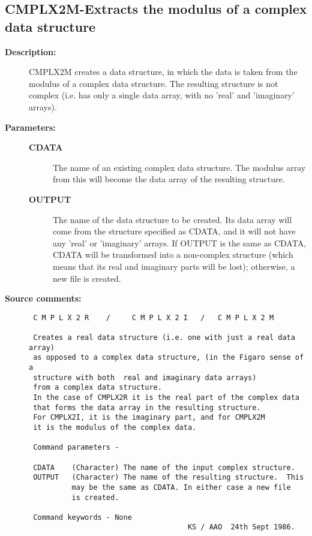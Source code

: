 \subsection{CMPLX2M-\label{CMPLX2M}Extracts the modulus of a complex data structure}
\begin{description}

\item [{\bf Description:}]
 CMPLX2M creates a data structure, in which the data is taken
 from the modulus of a complex data structure.  The resulting
 structure is not complex (i.e. has only a single data array, with
 no 'real' and 'imaginary' arrays).

\item [{\bf Parameters:}]
\begin{description}
\item [{\bf CDATA}]
 The name of an existing complex data structure.
 The modulus array from this will become the data array
 of the resulting structure.
\item [{\bf OUTPUT}]
 The name of the data structure to be created.
 Its data array will come from the structure specified as
 CDATA, and it will not have any 'real' or 'imaginary'
 arrays.  If OUTPUT is the same as CDATA, CDATA will be
 transformed into a non-complex structure (which means
 that its real and imaginary parts will be lost);
 otherwise, a new file is created.
\end{description}

\item [{\bf Source comments:}]
\begin{verbatim}
 C M P L X 2 R    /     C M P L X 2 I   /   C M P L X 2 M

 Creates a real data structure (i.e. one with just a real data array)
 as opposed to a complex data structure, (in the Figaro sense of a
 structure with both  real and imaginary data arrays)
 from a complex data structure.
 In the case of CMPLX2R it is the real part of the complex data
 that forms the data array in the resulting structure.
 For CMPLX2I, it is the imaginary part, and for CMPLX2M
 it is the modulus of the complex data.

 Command parameters -

 CDATA    (Character) The name of the input complex structure.
 OUTPUT   (Character) The name of the resulting structure.  This
          may be the same as CDATA. In either case a new file
          is created.

 Command keywords - None
                                     KS / AAO  24th Sept 1986.
\end{verbatim}
\end{description}
